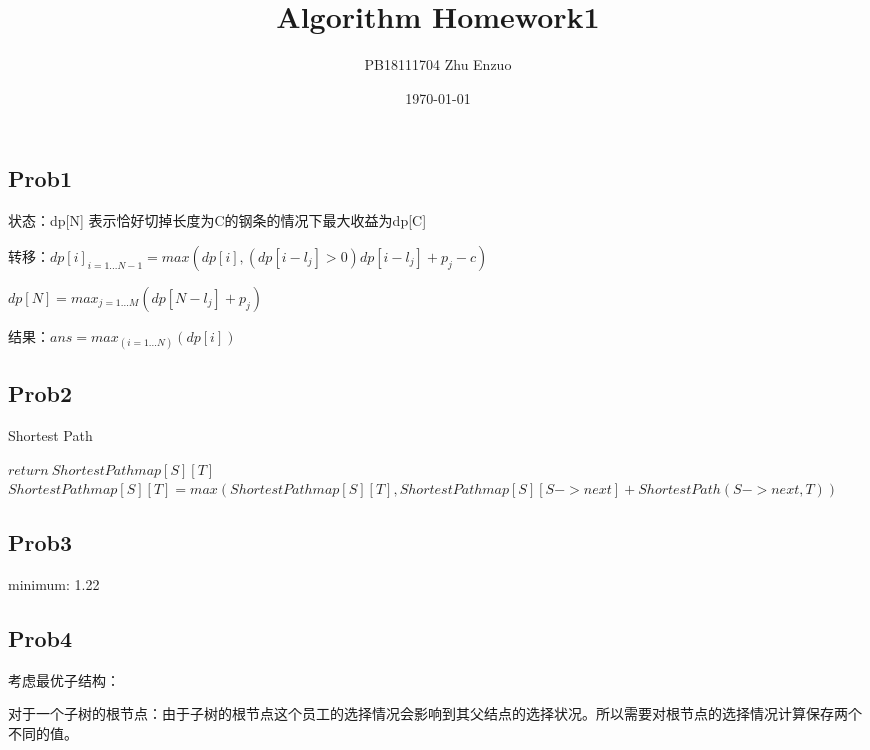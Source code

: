 \documentclass{ctexart}
\title{Algorithm Homework1}
\author{PB18111704 Zhu Enzuo}
\date{\today}
\begin{document}
\maketitle
\subsection{Prob1}

状态：dp[N] 表示恰好切掉长度为C的钢条的情况下最大收益为dp[C]

转移：$dp[i]_{i=1...N-1}=max(dp[i],(dp[i-l_j]>0)dp[i-l_j]+p_j-c)$

$dp[N]=max_{j=1...M}(dp[N-l_j]+p_j)$

结果：$ans=max_(i=1...N)(dp[i])$

\subsection{Prob2}
\begin{algorithm}
    \caption{Shortest Path}
    \begin{algorithmic}
                \State $return\ ShortestPathmap[S][T]$
            \Else
                    \State $ShortestPathmap[S][T]=max(ShortestPathmap[S][T],ShortestPathmap[S][S->next]+ShortestPath(S->next,T))$
                \EndFor
            \EndIf
        \EndProcedure
    \end{algorithmic}
\end{algorithm}

\subsection{Prob3}
minimum: 1.22

\subsection{Prob4}

考虑最优子结构：

对于一个子树的根节点：由于子树的根节点这个员工的选择情况会影响到其父结点的选择状况。所以需要对根节点的选择情况计算保存两个不同的值。
\end{document}
